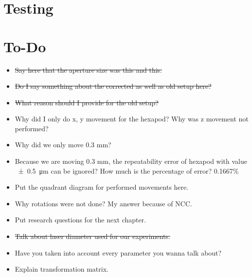 \section{Testing}

\section*{To-Do}
\begin{itemize}
    \item \sout{Say here that the aperture size was this and this.}
    \item \sout{Do I say something about the corrected as well as old setup here?}
    \item \sout{What reason should I provide for the old setup?}
    \item Why did I only do x, y movement for the hexapod? Why was z movement not performed?
    \item Why did we only move 0.3 mm?
    \item Because we are moving 0.3 mm, the repeatability error of hexapod with value \SI{\pm0.5}{\micro\meter} can be ignored? How much is the percentage of error? 0.1667\%
    \item Put the quadrant diagram for performed movements here.
    \item Why rotations were not done? My answer because of NCC.
    \item Put research questions for the next chapter.
    \item \sout{Talk about laser diameter used for our experiments.}
    \item Have you taken into account every parameter you wanna talk about?
    \item Explain transformation matrix. 
\end{itemize}